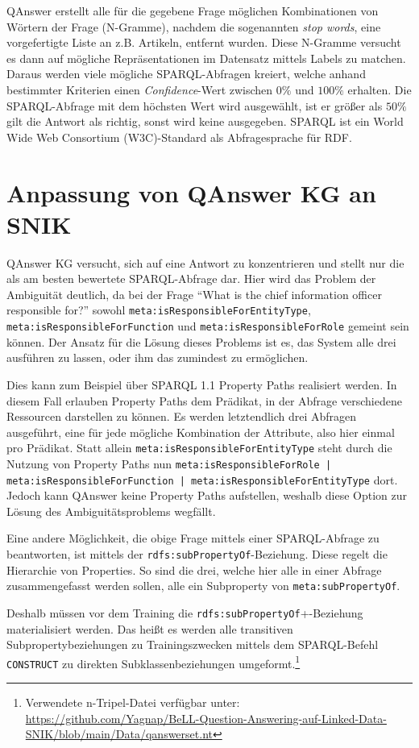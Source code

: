 \documentclass[utf8,biblatex]{lni}
\begin{document}
QAnswer erstellt alle für die gegebene Frage möglichen Kombinationen von Wörtern der Frage (N-Gramme), nachdem die sogenannten \emph{stop words}, eine vorgefertigte Liste an z.B. Artikeln, entfernt wurden.
Diese N-Gramme versucht es dann auf mögliche Repräsentationen im Datensatz mittels Labels zu matchen.
Daraus werden viele mögliche SPARQL-Abfragen kreiert, welche anhand bestimmter Kriterien einen \emph{Confidence}-Wert zwischen $0\%$ und $100\%$ erhalten.
Die SPARQL-Abfrage mit dem höchsten Wert wird ausgewählt, ist er größer als $50\%$ gilt die Antwort als richtig, sonst wird keine ausgegeben.
SPARQL ist ein World Wide Web Consortium (W3C)-Standard als Abfragesprache für RDF.

\section{Anpassung von QAnswer KG an SNIK}

QAnswer KG versucht, sich auf eine Antwort zu konzentrieren und stellt nur die als am besten bewertete SPARQL-Abfrage dar.
Hier wird das Problem der Ambiguität deutlich, da bei der Frage \enquote{What is the chief information officer responsible for?} sowohl
\texttt{meta:isResponsibleForEntityType}, \texttt{meta:isResponsibleForFunction} und \texttt{meta:isResponsibleForRole} gemeint sein können.
Der Ansatz für die Lösung dieses Problems ist es, das System alle drei ausführen zu lassen, oder ihm das zumindest zu ermöglichen.

Dies kann zum Beispiel über SPARQL 1.1 Property Paths realisiert werden.
In diesem Fall erlauben Property Paths dem Prädikat, in der Abfrage verschiedene Ressourcen darstellen zu können.
Es werden letztendlich drei Abfragen ausgeführt, eine für jede mögliche Kombination der Attribute, also hier einmal pro Prädikat.
Statt allein \texttt{meta:isResponsibleForEntityType} steht durch die Nutzung von Property Paths nun \texttt{meta:isResponsibleForRole | meta:isResponsibleForFunction | meta:isResponsibleForEntityType} dort.
Jedoch kann QAnswer keine Property Paths aufstellen, weshalb diese Option zur Lösung des Ambiguitätsproblems wegfällt.

Eine andere Möglichkeit, die obige Frage mittels einer SPARQL-Abfrage zu beantworten, ist mittels der \texttt{rdfs:subPropertyOf}-Beziehung.
Diese regelt die Hierarchie von Properties.
So sind die drei, welche hier alle in einer Abfrage zusammengefasst werden sollen, alle ein Subproperty von \texttt{meta:subPropertyOf}.

Deshalb müssen vor dem Training die \texttt{rdfs:subPropertyOf}+-Beziehung materialisiert werden.
Das heißt es werden alle transitiven Subpropertybeziehungen zu Trainingszwecken mittels dem SPARQL-Befehl \texttt{CONSTRUCT} zu direkten Subklassenbeziehungen umgeformt.\footnote{Verwendete n-Tripel-Datei verfügbar unter:\\\url{https://github.com/Yagnap/BeLL-Question-Answering-auf-Linked-Data-SNIK/blob/main/Data/qanswerset.nt}}
\end{document}
